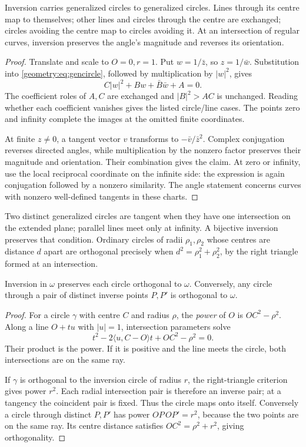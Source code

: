 \begin{theorem}\label{geometry:thm:invcircles}
Inversion carries generalized circles to generalized circles. Lines through its centre map to themselves; other lines and circles through the centre are exchanged; circles avoiding the centre map to circles avoiding it. At an intersection of regular curves, inversion preserves the angle's magnitude and reverses its orientation.
\end{theorem}
\begin{proof}
Translate and scale to $O=0,r=1$. Put $w=1/\bar z$, so $z=1/\bar w$. Substitution into \eqref{geometry:eq:gencircle}, followed by multiplication by $|w|^2$, gives
\[
C|w|^2+Bw+\bar B\bar w+A=0.
\]
The coefficient roles of $A,C$ are exchanged and $|B|^2>AC$ is unchanged. Reading whether each coefficient vanishes gives the listed circle/line cases. The points zero and infinity complete the images at the omitted finite coordinates.

At finite $z\ne0$, a tangent vector $v$ transforms to $-\bar v/\bar z^2$. Complex conjugation reverses directed angles, while multiplication by the nonzero factor preserves their magnitude and orientation. Their combination gives the claim. At zero or infinity, use the local reciprocal coordinate on the infinite side: the expression is again conjugation followed by a nonzero similarity. The angle statement concerns curves with nonzero well-defined tangents in these charts.
\end{proof}

Two distinct generalized circles are tangent when they have one intersection on the extended plane; parallel lines meet only at infinity. A bijective inversion preserves that condition. Ordinary circles of radii $\rho_1,\rho_2$ whose centres are distance $d$ apart are orthogonal precisely when $d^2=\rho_1^2+\rho_2^2$, by the right triangle formed at an intersection.

\begin{proposition}\label{geometry:prop:orthfixed}
Inversion in $\omega$ preserves each circle orthogonal to $\omega$. Conversely, any circle through a pair of distinct inverse points $P,P'$ is orthogonal to $\omega$.
\end{proposition}
\begin{proof}
For a circle $\gamma$ with centre $C$ and radius $\rho$, the \emph{power} of $O$ is $OC^2-\rho^2$. Along a line $O+tu$ with $|u|=1$, intersection parameters solve
\[
t^2-2\langle u,C-O\rangle t+OC^2-\rho^2=0.
\]
Their product is the power. If it is positive and the line meets the circle, both intersections are on the same ray.

If $\gamma$ is orthogonal to the inversion circle of radius $r$, the right-triangle criterion gives power $r^2$. Each radial intersection pair is therefore an inverse pair; at a tangency the coincident pair is fixed. Thus the circle maps onto itself. Conversely a circle through distinct $P,P'$ has power $OP\,OP'=r^2$, because the two points are on the same ray. Its centre distance satisfies $OC^2=\rho^2+r^2$, giving orthogonality.
\end{proof}

